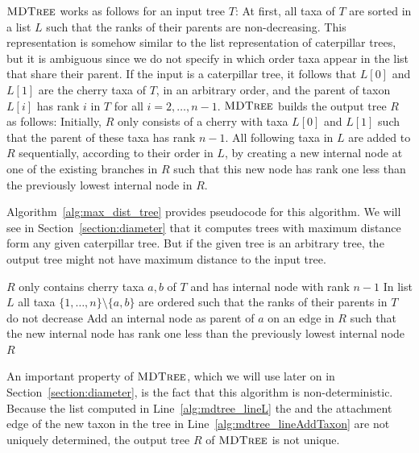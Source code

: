 \documentclass{amsart}
\newcommand{\mdtree}{\textsc{MDTree}}
\begin{document}
$\mdtree$ works as follows for an input tree $T$:
At first, all taxa of $T$ are sorted in a list $L$ such that the ranks of their parents are non-decreasing.
This representation is somehow similar to the list representation of caterpillar trees, but it is ambiguous since we do not specify in which order taxa appear in the list that share their parent.
If the input is a caterpillar tree, it follows that $L[0]$ and $L[1]$ are the cherry taxa of $T$, in an arbitrary order, and the parent of taxon $L[i]$ has rank $i$ in $T$ for all $i = 2, \ldots, n-1$.
$\mdtree$ builds the output tree $R$ as follows:
Initially, $R$ only consists of a cherry with taxa $L[0]$ and $L[1]$ such that the parent of these taxa has rank $n-1$.
All following taxa in $L$ are added to $R$ sequentially, according to their order in $L$, by creating a new internal node at one of the existing branches in $R$ such that this new node has rank one less than the previously lowest internal node in $R$.

Algorithm~\ref{alg:max_dist_tree} provides pseudocode for this algorithm.
We will see in Section~\ref{section:diameter} that it computes trees with maximum distance form any given caterpillar tree.
But if the given tree is an arbitrary tree, the output tree might not have maximum distance to the input tree.

\begin{algorithm}[H]
\caption{$\mdtree(T)$}
\label{alg:max_dist_tree}
\begin{algorithmic}[1]
\STATE $R$ only contains cherry taxa $a, b$ of $T$ and has internal node with rank $n-1$
\STATE In list $L$ all taxa $\{1,\ldots,n\}\setminus\{a,b\}$ are ordered such that the ranks of their parents in $T$ do not decrease \label{alg:mdtree_lineL}
\STATE Add an internal node as parent of $a$ on an edge in $R$ such that the new internal node has rank one less than the previously lowest internal node \label{alg:mdtree_lineAddTaxon}
\ENDFOR
\RETURN $R$
\end{algorithmic}
\end{algorithm}

An important property of $\mdtree$, which we will use later on in Section~\ref{section:diameter}, is the fact that this algorithm is non-deterministic.
Because the list computed in Line~\ref{alg:mdtree_lineL} the and the attachment edge of the new taxon in the tree in Line~\ref{alg:mdtree_lineAddTaxon} are not uniquely determined, the output tree $R$ of $\mdtree$ is not unique.
\end{document}
